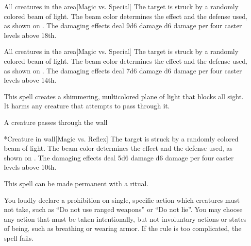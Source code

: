 \begin{spelltargets}{All creatures in the area}[Magic vs. Special]
    \spellspecial The target is struck by a randomly colored beam of light. The beam color determines the effect and the defense used, as shown on . The damaging effects deal 9d6 damage \add d6 damage per four caster levels above 18th.
\end{spelltargets}

\begin{spelltargets}{All creatures in the area}[Magic vs. Special]
    \spellspecial The target is struck by a randomly colored beam of light. The beam color determines the effect and the defense used, as shown on . The damaging effects deal 7d6 damage \add d6 damage per four caster levels above 14th.
\end{spelltargets}

\spelldur{\durshort \dismissable}
\spellline
\spelleffect This spell creates a shimmering, multicolored plane of light that blocks all sight. It harms any creature that attempts to pass through it.
\begin{spelltrigger}{A creature passes through the wall}
    \begin{spelltarget}*{Creature in wall}[Magic vs. Reflex]
        \spellspecial The target is struck by a randomly colored beam of light. The beam color determines the effect and the defense used, as shown on . The damaging effects deal 5d6 damage \add d6 damage per four caster levels above 10th.
    \end{spelltarget}
\end{spelltrigger}
\spellnotes This spell can be made permanent with a  ritual.

\spelldur{\durshort}
\spellline
\spelleffect You loudly declare a prohibition on single, specific action which creatures must not take, such as ``Do not use ranged weapons'' or ``Do not lie''. You may choose any action that must be taken intentionally, but not involuntary actions or states of being, such as breathing or wearing armor. If the rule is too complicated, the spell fails.

